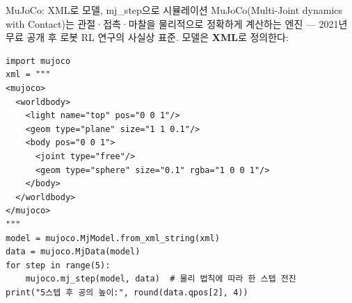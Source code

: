 \documentclass[aspectratio=169,11pt]{beamer}
\begin{document}
\begin{frame}[fragile]{MuJoCo: XML로 모델, mj\_step으로 시뮬레이션}
  MuJoCo(Multi-Joint dynamics with Contact)는 관절·접촉·마찰을
  물리적으로 정확하게 계산하는 엔진 --- 2021년 무료 공개 후 로봇 RL
  연구의 사실상 표준. 모델은 \textbf{XML}로 정의한다:
\begin{lstlisting}
import mujoco
xml = """
<mujoco>
  <worldbody>
    <light name="top" pos="0 0 1"/>
    <geom type="plane" size="1 1 0.1"/>
    <body pos="0 0 1">
      <joint type="free"/>
      <geom type="sphere" size="0.1" rgba="1 0 0 1"/>
    </body>
  </worldbody>
</mujoco>
"""
model = mujoco.MjModel.from_xml_string(xml)
data = mujoco.MjData(model)
for step in range(5):
    mujoco.mj_step(model, data)  # 물리 법칙에 따라 한 스텝 전진
print("5스텝 후 공의 높이:", round(data.qpos[2], 4))
\end{lstlisting}
\end{frame}

\end{document}
